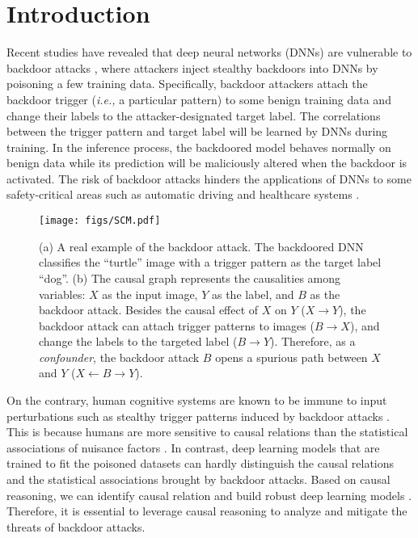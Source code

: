 \section{Introduction}
Recent studies have revealed that deep neural networks (DNNs) are vulnerable to backdoor attacks \cite{gu2017badnets, liu2018trojaning, saha2020hidden}, where attackers inject stealthy backdoors into DNNs by poisoning a few training data. 
Specifically, backdoor attackers attach the backdoor trigger (\emph{i.e.,} a particular pattern) to some benign
training data and change their labels to the attacker-designated target label. The correlations between the trigger pattern and target label will be learned by DNNs during training.
In the inference process, the backdoored model behaves normally on benign data while its prediction will be maliciously altered when the backdoor is activated. The risk of backdoor attacks hinders the applications of DNNs to some safety-critical areas such as automatic driving \cite{liu2018trojaning} and healthcare systems \cite{feng2021fiba}.
\begin{figure}[t]
    \centering
    \texttt{[image: figs/SCM.pdf]}
    \caption{(a) A real example of the backdoor attack. The backdoored DNN classifies the ``turtle'' image with a trigger pattern as the target label ``dog''. (b) The causal graph represents the causalities among variables: $X$ as the input image, $Y$ as the label, and $B$ as the backdoor attack. Besides the causal effect of $X$ on $Y$ ($X \rightarrow Y$), the backdoor attack can attach trigger patterns to images ($B \rightarrow X$), and change the labels to the targeted label ($B \rightarrow Y$). Therefore, as a \emph{confounder}, the backdoor attack $B$ opens a spurious path between $X$ and $Y$ ($X \leftarrow B \rightarrow Y$).}
    \label{scm}
    \vspace{-1em}
\end{figure}

On the contrary, human cognitive systems are known to be immune to input perturbations such as stealthy trigger patterns induced by backdoor attacks \cite{gopnik2004theory}.
This is because humans are more sensitive to causal relations than the statistical associations of nuisance factors  \cite{ lake2017building, tenenbaum2011grow}. In contrast, deep learning models that are trained to fit the poisoned datasets can hardly distinguish the causal relations and the statistical associations brought by backdoor attacks. Based on causal reasoning, we can identify causal relation \cite{causality, causalinference} and build robust deep learning models \cite{zhang2020causal, zhang2022adversarial}. Therefore, it is essential to leverage causal reasoning to analyze and mitigate the threats of backdoor attacks.

